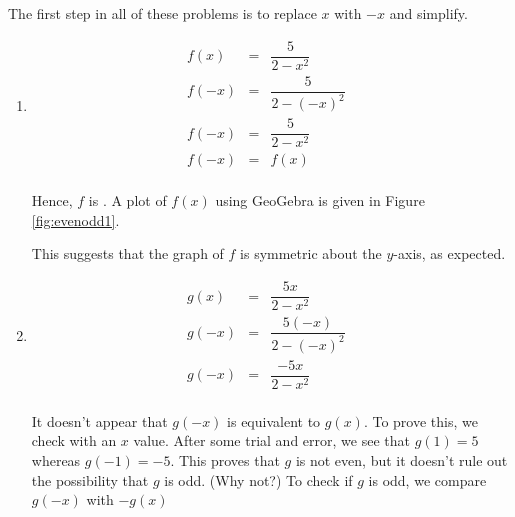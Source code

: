 {
The first step in all of these problems is to replace $x$ with $-x$ and simplify.

\begin{enumerate}

\setlength{\extrarowheight}{8pt}

\item  \[ \begin{array}{rclr}   

f(x) & = & \dfrac{5}{2 - x^2} & \\ 
f(-x) & = & \dfrac{5}{2 - (-x)^2} & \\  
f(-x) & = & \dfrac{5}{2 - x^2} & \\  
f(-x) & = & f(x) & \\

\end{array} \]

Hence, $f$ is .  A plot of $f(x)$ using GeoGebra is given in Figure \ref{fig:evenodd1}.



This suggests that the graph of $f$ is symmetric about the $y$-axis, as expected.


\item  \[ \begin{array}{rclr}   

g(x) & = & \dfrac{5x}{2 - x^2} & \\ 
g(-x) & = & \dfrac{5(-x)}{2 - (-x)^2} & \\  
g(-x) & = & \dfrac{-5x}{2 - x^2} & \\  

\end{array} \]

It doesn't appear that $g(-x)$ is equivalent to $g(x)$.  To prove this, we check with an $x$ value.  After some trial and error, we see that $g(1) = 5$ whereas $g(-1) = -5$.  This proves that $g$ is not even, but it doesn't rule out the possibility that $g$ is odd. (Why not?)  To check if $g$ is odd, we compare $g(-x)$ with $-g(x)$


 \[ \begin{array}{rclr}   


\end{array}\]
\end{enumerate}}
